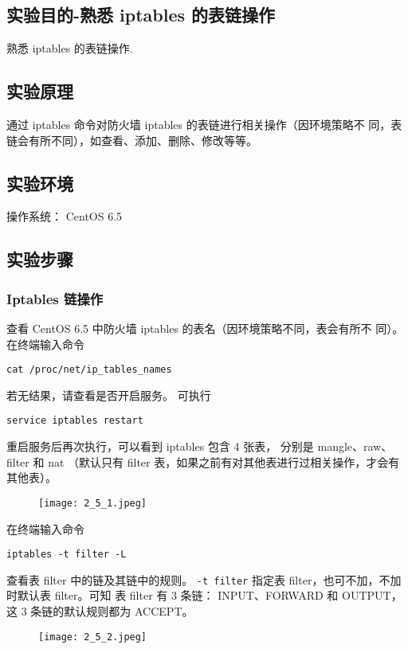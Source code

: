 \subsection{实验目的-熟悉 iptables 的表链操作}
熟悉 iptables 的表链操作.
%
\subsection{实验原理}
通过 iptables 命令对防火墙 iptables 的表链进行相关操作（因环境策略不
同，表链会有所不同），如查看、添加、删除、修改等等。
%
\subsection{实验环境}
操作系统： CentOS 6.5
%
\subsection{实验步骤}
\subsubsection{Iptables 链操作}
查看 CentOS 6.5 中防火墙 iptables 的表名（因环境策略不同，表会有所不
同）。
在终端输入命令
\begin{verbatim}
cat /proc/net/ip_tables_names
\end{verbatim}
若无结果，请查看是否开启服务。
可执行
\begin{verbatim}
service iptables restart
\end{verbatim}
重启服务后再次执行，可以看到 iptables 包含 4 张表，
分别是 mangle、raw、filter 和 nat
（默认只有 filter 表，如果之前有对其他表进行过相关操作，才会有其他表）。
\begin{figure}[H]
  \begin{center}
    \texttt{[image: 2\_5\_1.jpeg]}
  \end{center}
\end{figure}

在终端输入命令
\begin{verbatim}
iptables -t filter -L
\end{verbatim}
查看表 filter 中的链及其链中的规则。
\texttt{-t filter} 指定表 filter，也可不加，不加时默认表 filter。可知
表 filter 有 3 条链：
INPUT、FORWARD 和 OUTPUT，这 3 条链的默认规则都为 ACCEPT。
\begin{figure}[H]
  \begin{center}
    \texttt{[image: 2\_5\_2.jpeg]}
  \end{center}
\end{figure}

